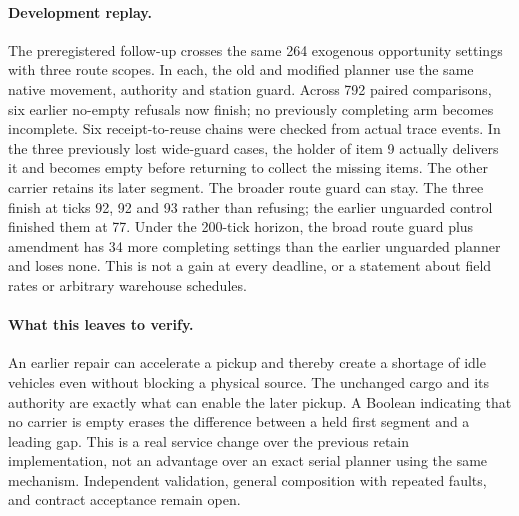 \documentclass{article}
\begin{document}
\paragraph{Development replay.}
The preregistered follow-up crosses the same 264 exogenous opportunity settings with three route scopes. In each, the old and modified planner use the same native movement, authority and station guard. Across 792 paired comparisons, six earlier no-empty refusals now finish; no previously completing arm becomes incomplete. Six receipt-to-reuse chains were checked from actual trace events. In the three previously lost wide-guard cases, the holder of item 9 actually delivers it and becomes empty before returning to collect the missing items. The other carrier retains its later segment. The broader route guard can stay. The three finish at ticks 92, 92 and 93 rather than refusing; the earlier unguarded control finished them at 77. Under the 200-tick horizon, the broad route guard plus amendment has 34 more completing settings than the earlier unguarded planner and loses none. This is not a gain at every deadline, or a statement about field rates or arbitrary warehouse schedules.

\paragraph{What this leaves to verify.}
An earlier repair can accelerate a pickup and thereby create a shortage of idle vehicles even without blocking a physical source. The unchanged cargo and its authority are exactly what can enable the later pickup. A Boolean indicating that no carrier is empty erases the difference between a held first segment and a leading gap. This is a real service change over the previous retain implementation, not an advantage over an exact serial planner using the same mechanism. Independent validation, general composition with repeated faults, and contract acceptance remain open.
\end{document}
